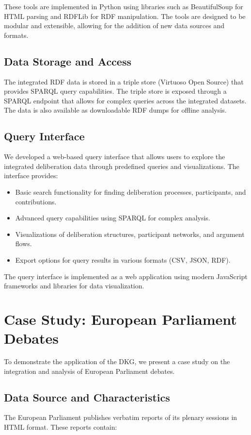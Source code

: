 \documentclass[runningheads]{llncs}  %
\begin{document}
These tools are implemented in Python using libraries such as BeautifulSoup for HTML parsing and RDFLib for RDF manipulation. The tools are designed to be modular and extensible, allowing for the addition of new data sources and formats.

\subsection{Data Storage and Access}
The integrated RDF data is stored in a triple store (Virtuoso Open Source) that provides SPARQL query capabilities. The triple store is exposed through a SPARQL endpoint that allows for complex queries across the integrated datasets. The data is also available as downloadable RDF dumps for offline analysis.

\subsection{Query Interface}
We developed a web-based query interface that allows users to explore the integrated deliberation data through predefined queries and visualizations. The interface provides:

\begin{itemize}
    \item Basic search functionality for finding deliberation processes, participants, and contributions.
    \item Advanced query capabilities using SPARQL for complex analysis.
    \item Visualizations of deliberation structures, participant networks, and argument flows.
    \item Export options for query results in various formats (CSV, JSON, RDF).
\end{itemize}

The query interface is implemented as a web application using modern JavaScript frameworks and libraries for data visualization.

\section{Case Study: European Parliament Debates}
To demonstrate the application of the DKG, we present a case study on the integration and analysis of European Parliament debates.

\subsection{Data Source and Characteristics}
The European Parliament publishes verbatim reports of its plenary sessions in HTML format. These reports contain:
\end{document}

